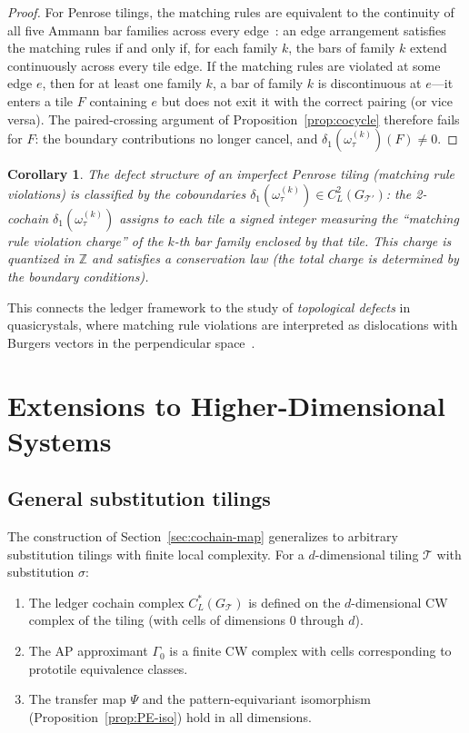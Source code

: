 \documentclass[12pt]{article}
\newtheorem{corollary}[theorem]{Corollary}
\theoremstyle{definition}
\theoremstyle{remark}
\newcommand{\ZZ}{\mathbb{Z}}
\begin{document}
\begin{proof}
For Penrose tilings, the matching rules are equivalent to the continuity of all five Ammann bar families across every edge~\cite{GrunbaumShephard1987,BaakeGrimm2013}: an edge arrangement satisfies the matching rules if and only if, for each family $k$, the bars of family $k$ extend continuously across every tile edge. If the matching rules are violated at some edge $e$, then for at least one family $k$, a bar of family $k$ is discontinuous at $e$---it enters a tile $F$ containing $e$ but does not exit it with the correct pairing (or vice versa). The paired-crossing argument of Proposition~\ref{prop:cocycle} therefore fails for $F$: the boundary contributions no longer cancel, and $\delta_1(\omega_\tau^{(k)})(F) \neq 0$.
\end{proof}

\begin{corollary}
The defect structure of an imperfect Penrose tiling (matching rule violations) is classified by the coboundaries $\delta_1(\omega_\tau^{(k)}) \in C^2_L(G_{\mathcal{T}'})$: the 2-cochain $\delta_1(\omega_\tau^{(k)})$ assigns to each tile a signed integer measuring the ``matching rule violation charge'' of the $k$-th bar family enclosed by that tile. This charge is quantized in $\ZZ$ and satisfies a conservation law (the total charge is determined by the boundary conditions).
\end{corollary}

This connects the ledger framework to the study of \emph{topological defects} in quasicrystals, where matching rule violations are interpreted as dislocations with Burgers vectors in the perpendicular space~\cite{Socolar1986}.

\section{Extensions to Higher-Dimensional Systems}
\label{sec:higher-dim}

\subsection{General substitution tilings}

The construction of Section~\ref{sec:cochain-map} generalizes to arbitrary substitution tilings with finite local complexity. For a $d$-dimensional tiling $\mathcal{T}$ with substitution $\sigma$:

\begin{enumerate}
\item The ledger cochain complex $C^*_L(G_{\mathcal{T}})$ is defined on the $d$-dimensional CW complex of the tiling (with cells of dimensions $0$ through $d$).
\item The AP approximant $\Gamma_0$ is a finite CW complex with cells corresponding to prototile equivalence classes.
\item The transfer map $\Psi$ and the pattern-equivariant isomorphism (Proposition~\ref{prop:PE-iso}) hold in all dimensions.
\end{enumerate}
\end{document}
